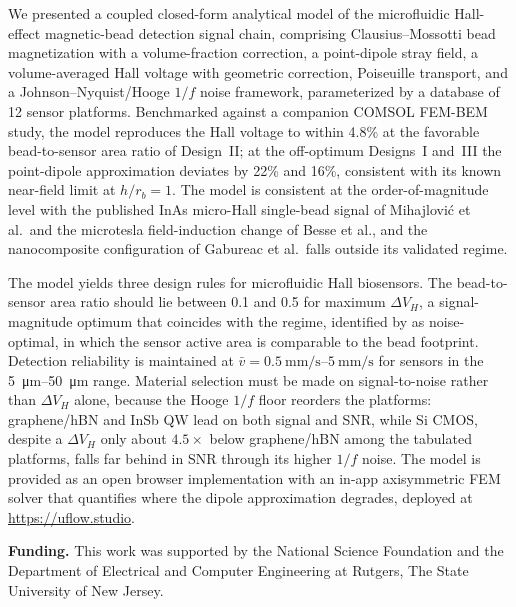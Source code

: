 \documentclass[pdflatex,sn-basic]{sn-jnl}
\theoremstyle{thmstyleone}
\theoremstyle{thmstyletwo}
\theoremstyle{thmstylethree}
\begin{document}
We presented a coupled closed-form analytical model of the microfluidic Hall-effect magnetic-bead detection signal chain, comprising Clausius--Mossotti bead magnetization with a volume-fraction correction, a point-dipole stray field, a volume-averaged Hall voltage with geometric correction, Poiseuille transport, and a Johnson--Nyquist/Hooge $1/f$ noise framework, parameterized by a database of 12 sensor platforms. Benchmarked against a companion COMSOL FEM-BEM study, the model reproduces the Hall voltage to within 4.8\% at the favorable bead-to-sensor area ratio of Design~II; at the off-optimum Designs~I and~III the point-dipole approximation deviates by 22\% and 16\%, consistent with its known near-field limit at $h/r_b = 1$. The model is consistent at the order-of-magnitude level with the published InAs micro-Hall single-bead signal of Mihajlovi\'{c} et al.\ and the microtesla field-induction change of Besse et al., and the nanocomposite configuration of Gabureac et al.\ falls outside its validated regime.

The model yields three design rules for microfluidic Hall biosensors. The bead-to-sensor area ratio should lie between 0.1 and 0.5 for maximum $\Delta V_H$, a signal-magnitude optimum that coincides with the regime, identified by \citet{mihajlovic2007} as noise-optimal, in which the sensor active area is comparable to the bead footprint. Detection reliability is maintained at $\bar{v} = \SIrange{0.5}{5}{\milli\meter\per\second}$ for sensors in the \SIrange{5}{50}{\micro\meter} range. Material selection must be made on signal-to-noise rather than $\Delta V_H$ alone, because the Hooge $1/f$ floor reorders the platforms: graphene/hBN and InSb QW lead on both signal and SNR, while Si CMOS, despite a $\Delta V_H$ only about $4.5\times$ below graphene/hBN among the tabulated platforms, falls far behind in SNR through its higher $1/f$ noise. The model is provided as an open browser implementation with an in-app axisymmetric FEM solver that quantifies where the dipole approximation degrades, deployed at \url{https://uflow.studio}.


\textbf{Funding.} This work was supported by the National Science Foundation %
and the Department of Electrical and Computer Engineering at Rutgers, The State University of New Jersey.
\end{document}
